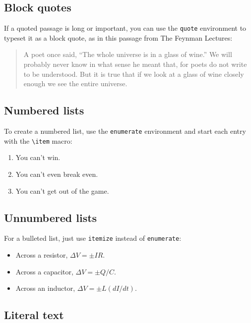 \documentclass[prb,preprint]{revtex4-1}
\begin{document}
\subsection{Block quotes}  %

If a quoted passage is long or important, you can use the \texttt{quote} 
environment to typeset it as a block quote, as in this passage from The 
Feynman Lectures:\cite{feynman}
\begin{quote}
A poet once said, ``The whole universe is in a glass of wine.'' We will 
probably never know in what sense he meant that, for poets do not write 
to be understood. But it is true that if we look at a glass of wine closely 
enough we see the entire universe.
\end{quote}

\subsection{Numbered lists}

To create a numbered list, use the \texttt{enumerate} environment and start
each entry with the \verb/\item/ macro:
\begin{enumerate}
\item You can't win.
\item You can't even break even.
\item You can't get out of the game.
\end{enumerate}

\subsection{Unnumbered lists}

For a bulleted list, just use \texttt{itemize} instead of \texttt{enumerate}:
\begin{itemize}
\item Across a resistor, $\Delta V = \pm IR$.
\item Across a capacitor, $\Delta V = \pm Q/C$.
\item Across an inductor, $\Delta V = \pm L(dI/dt)$.
\end{itemize}

\subsection{Literal text}
\end{document}
